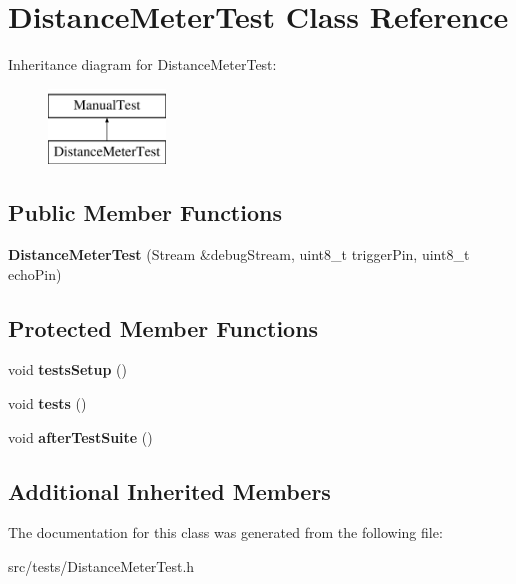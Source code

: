 \hypertarget{class_distance_meter_test}{}\section{Distance\+Meter\+Test Class Reference}
\label{class_distance_meter_test}
Inheritance diagram for Distance\+Meter\+Test\+:\begin{figure}[H]
\begin{center}
\leavevmode
\includegraphics[height=2.000000cm]{class_distance_meter_test}
\end{center}
\end{figure}
\subsection*{Public Member Functions}
\begin{DoxyCompactItemize}
\item 
\mbox{\label{class_distance_meter_test_a72bec787e1e981840ea0399d68a18ac1}} 
{\bfseries Distance\+Meter\+Test} (Stream \&debug\+Stream, uint8\+\_\+t trigger\+Pin, uint8\+\_\+t echo\+Pin)
\end{DoxyCompactItemize}
\subsection*{Protected Member Functions}
\begin{DoxyCompactItemize}
\item 
\mbox{\label{class_distance_meter_test_a3e9d2311b2c2740515cf70d904b20271}} 
void {\bfseries tests\+Setup} ()
\item 
\mbox{\label{class_distance_meter_test_ac82e881bf404ac3b9b8c16c997f8e39e}} 
void {\bfseries tests} ()
\item 
\mbox{\label{class_distance_meter_test_ad3b3e352542cf2f1130e73bdc7d440b7}} 
void {\bfseries after\+Test\+Suite} ()
\end{DoxyCompactItemize}
\subsection*{Additional Inherited Members}


The documentation for this class was generated from the following file\+:\begin{DoxyCompactItemize}
\item 
src/tests/Distance\+Meter\+Test.\+h\end{DoxyCompactItemize}
